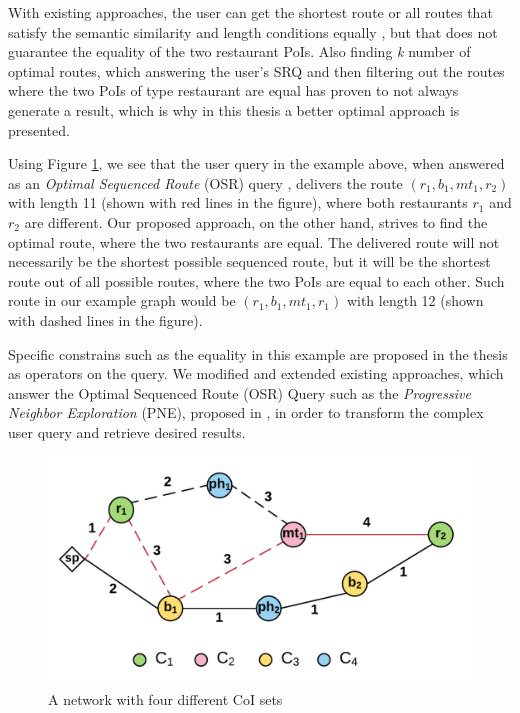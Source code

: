 With existing approaches, the user can get the shortest route \cite{OSR} or all routes that satisfy the semantic similarity and length conditions equally \cite{semanticSRQ}, but that does not guarantee the equality of the two restaurant PoIs. Also finding \textit{k} number of optimal routes, which answering the user's SRQ and then filtering out the routes where the two PoIs of type restaurant are equal has proven to not always generate a result, which is why in this thesis a better optimal approach is presented.

\enlargethispage*{30pt}

Using Figure \ref{fig:example}, we see that the user query in the example above, when answered as an \textit{Optimal Sequenced Route} (OSR) query \cite{OSR}, delivers the route $(r_1, b_1, mt_1, r_2)$ with length 11 (shown with red lines in the figure), where both restaurants $r_1$ and $r_2$ are different. Our proposed approach, on the other hand, strives to find the optimal route, where the two restaurants are equal. The delivered route will not necessarily be the shortest possible sequenced route, but it will be the shortest route out of all possible routes, where the two PoIs are equal to each other. Such route in our example graph would be $(r_1, b_1, mt_1, r_1)$ with length 12 (shown with dashed lines in the figure).

Specific constrains such as the equality in this example are proposed in the thesis as operators on the query. We modified and extended existing approaches, which answer the Optimal Sequenced Route (OSR) Query such as the \textit{Progressive Neighbor Exploration} (PNE), proposed in \cite{OSR}, in order to transform the complex user query and retrieve desired results.

\begin{figure}[H]
	\includegraphics[scale=1]{images/Example_V2.png}
	\centering
	\caption{A network with four different CoI sets}
	\label{fig:example}
\end{figure}

